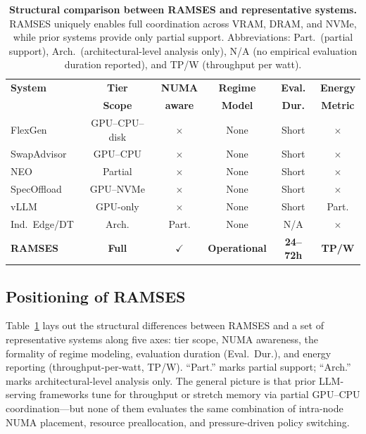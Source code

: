 \begin{table}[t]
\caption{\textbf{Structural comparison between RAMSES and representative systems.} RAMSES uniquely enables full coordination across VRAM, DRAM, and NVMe, while prior systems provide only partial support. Abbreviations: Part.\ (partial support), Arch.\ (architectural-level analysis only), N/A (no empirical evaluation duration reported), and TP/W (throughput per watt).}

\centering
\label{tab:related_positioning}
\setlength{\tabcolsep}{2.5pt}
\renewcommand{\arraystretch}{1.0}
\footnotesize
\begin{tabular}{lccccc}
\toprule
\textbf{System} &
\textbf{Tier} &
\textbf{NUMA} &
\textbf{Regime} &
\textbf{Eval.} &
\textbf{Energy}\\
&
\textbf{Scope} &
\textbf{aware} &
\textbf{Model} &
\textbf{Dur.} &
\textbf{Metric} \\
\midrule
FlexGen      & GPU--CPU--disk& $\times$ & None & Short & $\times$ \\
SwapAdvisor  & GPU--CPU     & $\times$ & None & Short & $\times$ \\
NEO          & Partial      & $\times$ & None & Short & $\times$ \\
SpecOffload  & GPU--NVMe    & $\times$ & None & Short & $\times$ \\
vLLM         & GPU-only     & $\times$ & None & Short & Part.    \\
Ind.\ Edge/DT& Arch.        & Part.    & None & N/A   & $\times$ \\
\textbf{RAMSES}
              & \textbf{Full} & $\checkmark$ & \textbf{Operational} & \textbf{24--72h} & \textbf{TP/W} \\
\bottomrule
\end{tabular}
\end{table}

\subsection{Positioning of RAMSES}
\label{sec:positioning}

Table~\ref{tab:related_positioning} lays out the structural differences
between RAMSES and a set of representative systems along five axes:
tier scope, NUMA awareness, the formality of regime modeling,
evaluation duration (Eval.~Dur.), and energy reporting (throughput-per-watt,
TP/W). ``Part.'' marks partial support; ``Arch.'' marks
architectural-level analysis only.
The general picture is that prior LLM-serving frameworks tune for
throughput or stretch memory via partial GPU--CPU coordination---but
none of them evaluates the same combination of intra-node NUMA placement, resource preallocation, and pressure-driven policy switching.

